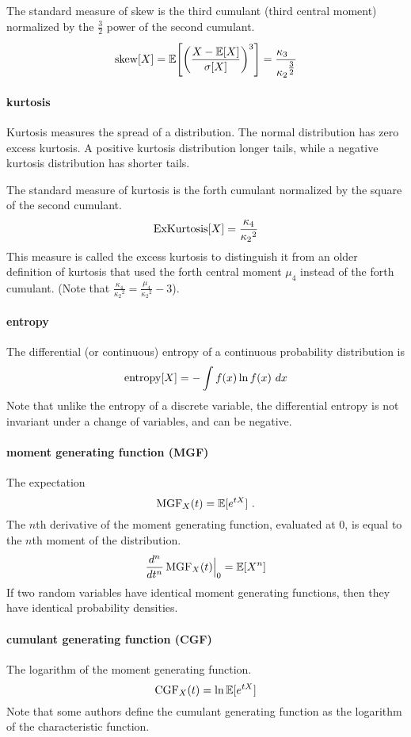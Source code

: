 The standard measure of skew is the third cumulant (third central moment) normalized by the $\tfrac{3}{2}$ power of the second cumulant.
\[
\op{skew}[X]    
= \expect\Left[ \Left( \frac{X-\expect[X]} {{\sigma}[X]} \Right)^3 \Right]
= \frac{\kappa_3\phantom{^{\tfrac{3}{2}}}}{{\kappa_2}^{\tfrac{3}{2}}}
\checked
\notag 
\]


\paragraph*{kurtosis}  Kurtosis measures the spread of a distribution. The normal distribution has zero excess kurtosis. A positive kurtosis distribution longer tails, while a negative kurtosis distribution has shorter tails.

The standard measure of kurtosis is the forth cumulant normalized by the square of the second cumulant.
\[
\operatorname{ExKurtosis}[X] = \frac{\kappa_4}{{\kappa_2}^{2}} 
\notag
\]
This measure is called the excess kurtosis to distinguish it from an older definition of kurtosis that used the forth central moment $\mu_4$ instead of the forth cumulant. (Note that  $\tfrac{\kappa_4}{{\kappa_2}^{2}} =  \frac{\mu_4}{{\kappa_2}^{2}} -3$\checked).


\paragraph*{entropy} 
The differential (or continuous) entropy of a continuous probability distribution is
\[
\operatorname{entropy}[X] = - \int f(x) \ln f(x)\  dx  
\notag
\]
Note that unlike the entropy of a discrete variable, the differential entropy is not invariant under a change of variables, and can be negative. 

\paragraph*{moment generating function (MGF) } 
The expectation
\[
\operatorname{MGF}_X(t) = \operatorname{\mathbb E}[e^{t X}]  \ . 
\notag
\]
The $n$th derivative of the moment generating function, evaluated at $0$, is equal to the $n$th moment of the distribution. 
\[
\frac{d^n}{dt^n}\operatorname{MGF}_X(t)\Big|_0 = \operatorname{\mathbb E}[X^n]  
\notag
\]
If two random variables have identical moment generating functions, then they have identical probability densities.


\paragraph*{cumulant generating function (CGF) }
\label{CGF}
The logarithm of the moment generating function.
\[
\operatorname{CGF}_X(t) = \ln \operatorname{\mathbb E}[e^{t X}] 
\notag
\]
Note that some authors define the cumulant generating function as the logarithm of the characteristic function.

